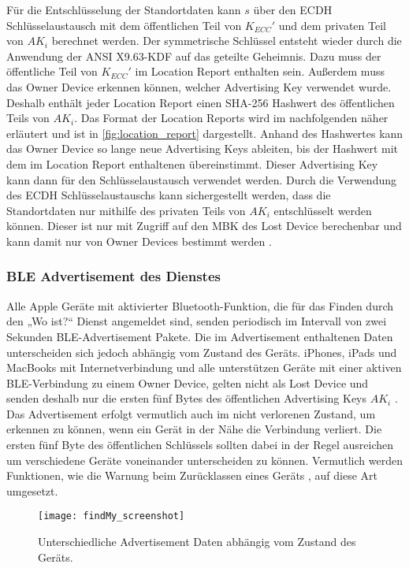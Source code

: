 Für die Entschlüsselung der Standortdaten kann $s$ über den \ac{ECDH} Schlüsselaustausch mit dem öffentlichen Teil von $K_{ECC}'$ und dem privaten Teil von $AK_i$ berechnet werden.
Der symmetrische Schlüssel entsteht wieder durch die Anwendung der ANSI X9.63-\ac{KDF} auf das geteilte Geheimnis.
Dazu muss der öffentliche Teil von $K_{ECC}'$ im Location Report enthalten sein.
Außerdem muss das Owner Device erkennen können, welcher Advertising Key verwendet wurde.
Deshalb enthält jeder Location Report einen \ac{SHA}-256 Hashwert des öffentlichen Teils von $AK_i$.
Das Format der Location Reports wird im nachfolgenden näher erläutert und ist in \autoref{fig:location_report} dargestellt.
Anhand des Hashwertes kann das Owner Device so lange neue Advertising Keys ableiten, bis der Hashwert mit dem im Location Report enthaltenen übereinstimmt.
Dieser Advertising Key kann dann für den Schlüsselaustausch verwendet werden.
Durch die Verwendung des \ac{ECDH} Schlüsselaustauschs kann sichergestellt werden, dass die Standortdaten nur mithilfe des privaten Teils von $AK_i$ entschlüsselt werden können.
Dieser ist nur mit Zugriff auf den \ac{MBK} des Lost Device berechenbar und kann damit nur von Owner Devices bestimmt werden \cite{Heinrich_FindMy}.


\subsubsection{\ac{BLE} Advertisement des Dienstes}
Alle Apple Geräte mit aktivierter Bluetooth-Funktion, die für das Finden durch den „Wo ist?“ Dienst angemeldet sind, senden periodisch im Intervall von zwei Sekunden \ac{BLE}-Advertisement Pakete.
Die im Advertisement enthaltenen Daten unterscheiden sich jedoch abhängig vom Zustand des Geräts.
iPhones, iPads und MacBooks mit Internetverbindung und alle unterstützen Geräte mit einer aktiven \ac{BLE}-Verbindung zu einem Owner Device, gelten nicht als Lost Device und senden deshalb nur die ersten fünf Bytes des öffentlichen Advertising Keys $AK_i$ \cite{Apple_FindMySpec}.
Das Advertisement erfolgt vermutlich auch im nicht verlorenen Zustand, um erkennen zu können, wenn ein Gerät in der Nähe die Verbindung verliert.
Die ersten fünf Byte des öffentlichen Schlüssels sollten dabei in der Regel ausreichen um verschiedene Geräte voneinander unterscheiden zu können.
Vermutlich werden Funktionen, wie die Warnung beim Zurücklassen eines Geräts \cite{Apple_FindMyWarning}, auf diese Art umgesetzt.
\begin{figure}[ht]
    \centering
    \texttt{[image: findMy\_screenshot]}
    \caption{Unterschiedliche Advertisement Daten abhängig vom Zustand des Geräts.}
    \label{fig:findMy_screenshot}
\end{figure}

